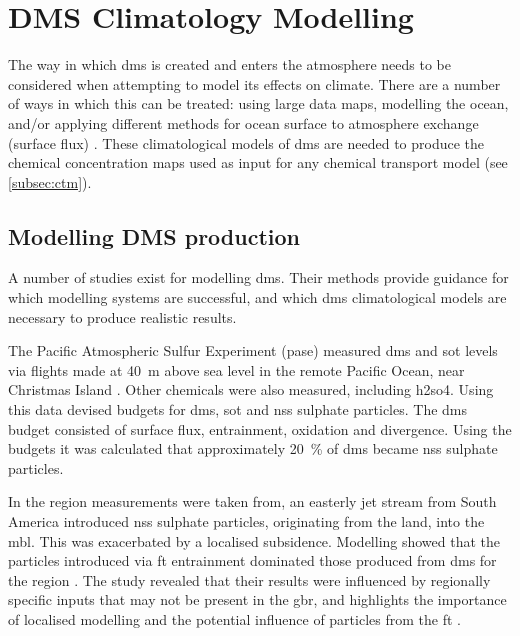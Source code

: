 
\chapter{DMS Climatology Modelling}
\label{ch:dmsclim}

The way in which \gls{dms} is created and enters the atmosphere needs to be considered when attempting to model its effects on climate. There are a number of ways in which this can be treated: using large data maps, modelling the ocean, and/or applying different methods for ocean surface to atmosphere exchange (surface flux) \citep{woodhouse:2010ed}. These climatological models of \gls{dms} are needed to produce the chemical concentration maps used as input for any chemical transport model (see \cref{subsec:ctm}).

	\section{Modelling DMS production}
	\label{sec:modeldms}

	A number of studies exist for modelling \gls{dms}. Their methods provide guidance for which modelling systems are successful, and which \gls{dms} climatological models are necessary to produce realistic results.

	The Pacific Atmospheric Sulfur Experiment (\gls{pase}) measured \gls{dms} and \gls{sot} levels via flights made at \SI{40}{\metre} above sea level in the remote Pacific Ocean, near Christmas Island \citep{bandy2011pacific}. Other chemicals were also measured, including \gls{h2so4}. Using this data \citet{simpson:2014} devised budgets for \gls{dms}, \gls{sot} and \gls{nss} sulphate particles. The \gls{dms} budget consisted of surface flux, entrainment, oxidation and divergence. Using the budgets it was calculated that approximately \SI{20}{\percent} of \gls{dms} became \gls{nss} sulphate particles. 

	In the region measurements were taken from, an easterly jet stream from South America introduced \gls{nss} sulphate particles, originating from the land, into the \gls{mbl}. This was exacerbated by a localised subsidence. Modelling showed that the particles introduced via \gls{ft} entrainment dominated those produced from \gls{dms} for the region \citep{simpson:2014}. The study revealed that their results were influenced by regionally specific inputs that may not be present in the \gls{gbr}, and highlights the importance of localised modelling and the potential influence of particles from the \gls{ft} \citep{simpson:2014}.

